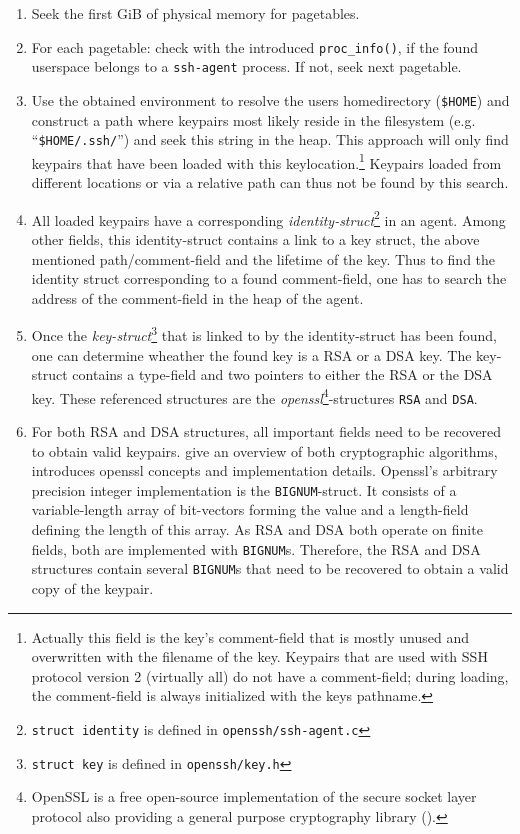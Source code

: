 \begin{enumerate}

	\item Seek the first GiB of physical memory for pagetables.

	\item For each pagetable: check with the introduced
	\texttt{proc\_info()}, if the found userspace belongs to a
	\texttt{ssh-agent} process. If not, seek next pagetable.

	\item Use the obtained environment to resolve the users homedirectory
	(\texttt{\$HOME}) and construct a path where keypairs most likely reside
	in the filesystem (e.g.  ``\texttt{\$HOME/.ssh/}'') and seek this string
	in the heap.  This approach will only find keypairs that have been
	loaded with this keylocation.\footnote{Actually this field is the key's
	comment-field that is mostly unused and overwritten with the filename of
	the key. Keypairs that are used with SSH protocol version 2 (virtually
	all) do not have a comment-field; during loading, the comment-field is
	always initialized with the keys pathname.} Keypairs loaded from
	different locations or via a relative path can thus not be found by this
	search.
	
	\item All loaded keypairs have a corresponding
	\emph{identity-struct}\footnote{\texttt{struct identity} is defined in
	\texttt{openssh/ssh-agent.c}} in an agent. Among other fields, this
	identity-struct contains a link to a key struct, the above mentioned
	path/comment-field and the lifetime of the key. Thus to find the
	identity struct corresponding to a found comment-field, one has to
	search the address of the comment-field in the heap of the agent.
	
	\item Once the \emph{key-struct}\footnote{\texttt{struct key} is defined
	in \texttt{openssh/key.h}} that is linked to by the identity-struct has
	been found, one can determine wheather the found key is a RSA or a DSA
	key.  The key-struct contains a type-field and two pointers to either
	the RSA or the DSA key. These referenced structures are the
	\emph{openssl}\footnote{OpenSSL is a free open-source implementation of
	the secure socket layer protocol also providing a general purpose
	cryptography library ().}-structures \texttt{RSA} and
	\texttt{DSA}.
	
	\item For both RSA and DSA structures, all important fields need to be
	recovered to obtain valid keypairs. \cite{applied_crypto:1996,
	handbook_applied_crypto:2001} give an overview of both cryptographic
	algorithms, \cite{openssl_book:2002} introduces openssl concepts and
	implementation details. Openssl's arbitrary precision integer
	implementation is the \texttt{BIGNUM}-struct. It consists of a
	variable-length array of bit-vectors forming the value and a
	length-field defining the length of this array. As RSA and DSA both
	operate on finite fields, both are implemented with \texttt{BIGNUM}s.
	Therefore, the RSA and DSA structures contain several \texttt{BIGNUM}s
	that need to be recovered to obtain a valid copy of the keypair.


\end{enumerate}
